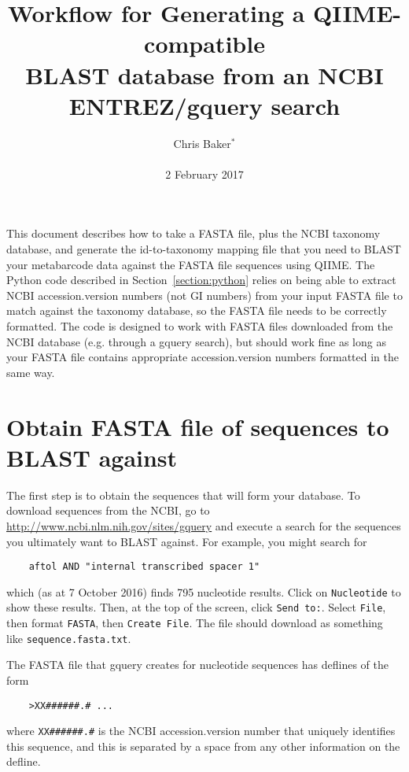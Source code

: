\documentclass[11pt]{amsart}
\title{Workflow for Generating a QIIME-compatible\\BLAST database from an NCBI ENTREZ/gquery search}
\author{Chris Baker$^*$\\ \\2 February 2017}
\begin{document}
\maketitle

\thispagestyle{fancy}

This document describes how to take a FASTA file, plus the NCBI taxonomy database, and generate the id-to-taxonomy mapping file that you need to BLAST your metabarcode data against the FASTA file sequences using QIIME. The Python code described in Section~\ref{section:python} relies on being able to extract NCBI accession.version numbers (not GI numbers) from your input FASTA file to match against the taxonomy database, so the FASTA file needs to be correctly formatted. The code is designed to work with FASTA files downloaded from the NCBI database (e.g. through a gquery search), but should work fine as long as your FASTA file contains appropriate accession.version numbers formatted in the same way.

\section{Obtain FASTA file of sequences to BLAST against}
\label{section:gquery}

The first step is to obtain the sequences that will form your database. To download sequences from the NCBI, go to \url{http://www.ncbi.nlm.nih.gov/sites/gquery} and execute a search for the sequences you ultimately want to BLAST against. For example, you might search for

\begin{verbatim}
    aftol AND "internal transcribed spacer 1"
\end{verbatim}

which (as at 7 October 2016) finds 795 nucleotide results. Click on \verb|Nucleotide| to show these results. Then, at the top of the screen, click \verb|Send to:|. Select \verb|File|, then format \verb|FASTA|, then \verb|Create File|. The file should download as something like \verb|sequence.fasta.txt|.

The FASTA file that gquery creates for nucleotide sequences has deflines of the form

\begin{verbatim}
    >XX######.# ...
\end{verbatim}

where \verb|XX######.#| is the NCBI accession.version number that uniquely identifies this sequence, and this is separated by a space from any other information on the defline.
\end{document}
